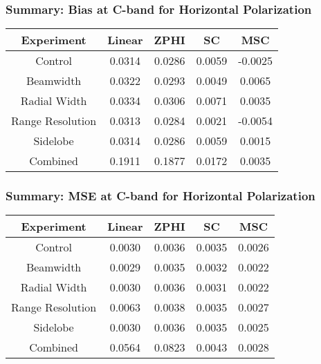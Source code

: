 \begin{frame}
    \frametitle{Summary: Bias at C-band for Horizontal Polarization}
    \begin{center}
        \begin{tabular}{| c | c | c | c | c |}
            \hline
            Experiment & Linear & ZPHI & SC & MSC \\
            \hline
            \hline
            Control & 0.0314 & 0.0286 & 0.0059 & -0.0025 \\
            Beamwidth & 0.0322 & 0.0293 & 0.0049 & 0.0065 \\
            Radial Width & 0.0334 & 0.0306 & 0.0071 & 0.0035 \\
            Range Resolution & 0.0313 & 0.0284 & 0.0021 & -0.0054 \\
            Sidelobe & 0.0314 & 0.0286 & 0.0059 & 0.0015 \\
            Combined & 0.1911 & 0.1877 & 0.0172 & 0.0035 \\
            \hline
        \end{tabular}
    \end{center}
\end{frame}

\begin{frame}
    \frametitle{Summary: MSE at C-band for Horizontal Polarization}
    \begin{center}
        \begin{tabular}{| c | c | c | c | c |}
            \hline
            Experiment & Linear & ZPHI & SC & MSC \\
            \hline
            \hline
            Control & 0.0030 & 0.0036 & 0.0035 & 0.0026 \\
            Beamwidth & 0.0029 & 0.0035 & 0.0032 & 0.0022 \\
            Radial Width & 0.0030 & 0.0036 & 0.0031 & 0.0022 \\
            Range Resolution & 0.0063 & 0.0038 & 0.0035 & 0.0027 \\
            Sidelobe & 0.0030 & 0.0036 & 0.0035 & 0.0025 \\
            Combined & 0.0564 & 0.0823 & 0.0043 & 0.0028 \\
            \hline
        \end{tabular}
    \end{center}
\end{frame}

